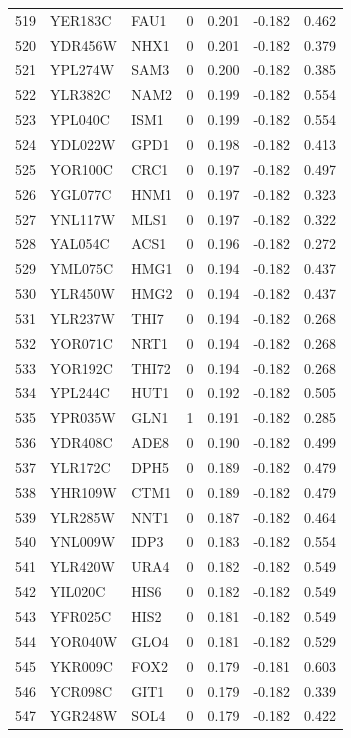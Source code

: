 \begin{longtable}{rllrrrr}
519 & YER183C & FAU1 & 0 & 0.201 & -0.182 & 0.462\\
520 & YDR456W & NHX1 & 0 & 0.201 & -0.182 & 0.379\\
521 & YPL274W & SAM3 & 0 & 0.200 & -0.182 & 0.385\\
522 & YLR382C & NAM2 & 0 & 0.199 & -0.182 & 0.554\\
523 & YPL040C & ISM1 & 0 & 0.199 & -0.182 & 0.554\\
524 & YDL022W & GPD1 & 0 & 0.198 & -0.182 & 0.413\\
525 & YOR100C & CRC1 & 0 & 0.197 & -0.182 & 0.497\\
526 & YGL077C & HNM1 & 0 & 0.197 & -0.182 & 0.323\\
527 & YNL117W & MLS1 & 0 & 0.197 & -0.182 & 0.322\\
528 & YAL054C & ACS1 & 0 & 0.196 & -0.182 & 0.272\\
529 & YML075C & HMG1 & 0 & 0.194 & -0.182 & 0.437\\
530 & YLR450W & HMG2 & 0 & 0.194 & -0.182 & 0.437\\
531 & YLR237W & THI7 & 0 & 0.194 & -0.182 & 0.268\\
532 & YOR071C & NRT1 & 0 & 0.194 & -0.182 & 0.268\\
533 & YOR192C & THI72 & 0 & 0.194 & -0.182 & 0.268\\
534 & YPL244C & HUT1 & 0 & 0.192 & -0.182 & 0.505\\
535 & YPR035W & GLN1 & 1 & 0.191 & -0.182 & 0.285\\
536 & YDR408C & ADE8 & 0 & 0.190 & -0.182 & 0.499\\
537 & YLR172C & DPH5 & 0 & 0.189 & -0.182 & 0.479\\
538 & YHR109W & CTM1 & 0 & 0.189 & -0.182 & 0.479\\
539 & YLR285W & NNT1 & 0 & 0.187 & -0.182 & 0.464\\
540 & YNL009W & IDP3 & 0 & 0.183 & -0.182 & 0.554\\
541 & YLR420W & URA4 & 0 & 0.182 & -0.182 & 0.549\\
542 & YIL020C & HIS6 & 0 & 0.182 & -0.182 & 0.549\\
543 & YFR025C & HIS2 & 0 & 0.181 & -0.182 & 0.549\\
544 & YOR040W & GLO4 & 0 & 0.181 & -0.182 & 0.529\\
545 & YKR009C & FOX2 & 0 & 0.179 & -0.181 & 0.603\\
546 & YCR098C & GIT1 & 0 & 0.179 & -0.182 & 0.339\\
547 & YGR248W & SOL4 & 0 & 0.179 & -0.182 & 0.422\\

\end{longtable}
